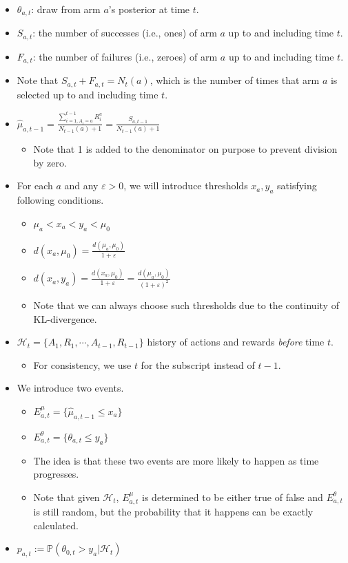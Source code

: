 \documentclass[11pt]{article}
\begin{document}
\begin{itemize}
    \item $\theta_{a, t}$: draw from arm $a$'s posterior at time $t$. 
    \item $S_{a, t}$: the number of successes (i.e., ones) of arm $a$
      up to and including time $t$.
    \item $F_{a, t}$: the number of failures (i.e., zeroes) of arm $a$
      up to and including time $t$. 
    \item Note that $S_{a, t} + F_{a, t} = N_t(a)$, which is the
      number of times that arm $a$ is selected up to and including time $t$. 
    \item $\hat{\mu}_{a, t-1} = \frac{\sum_{i=1, A_i = a}^{t-1}R_i^a}{N_{t-1}(a)+1} = \frac{S_{a, t-1}}{N_{t-1}(a) + 1}$
    \begin{itemize}
        \item Note that 1 is added to the denominator on purpose to prevent division by zero. 
    \end{itemize}
    \item For each $a$ and any $\varepsilon>0$, we will introduce thresholds $x_a, y_a$ satisfying following conditions. 
    \begin{itemize}
        \item $\mu_a < x_a < y_a < \mu_0$
        \item $d(x_a, \mu_0) = \frac{d(\mu_a, \mu_0)}{1 + \varepsilon}$
        \item $d(x_a, y_a) = \frac{d(x_a, \mu_0)}{1 + \varepsilon} = \frac{d(\mu_a, \mu_0)}{(1 + \varepsilon)^2}$
        \item Note that we can always choose such thresholds due to the continuity of KL-divergence. 
    \end{itemize}
    \item $\mathcal{H}_t = \{A_1, R_1, \cdots, A_{t-1}, R_{t-1}\}$ history of actions and rewards \textit{before} time $t$. 
    \begin{itemize}
        \item For consistency, we use $t$ for the subscript instead of $t-1$. 
    \end{itemize}
    \item We introduce two events. 
    \begin{itemize}
        \item $E^\mu_{a, t} = \{\hat{\mu}_{a, t-1} \leq x_a\}$
        \item $E^\theta_{a, t} = \{\theta_{a, t} \leq y_a\}$
        \item The idea is that these two events are more likely to
          happen as time progresses.
        \item Note that given $\mathcal{H}_t$, $E^\mu_{a, t}$ is determined to be either true of false and $E^\theta_{a, t}$ is still random, but the probability that it happens can be exactly calculated. 
    \end{itemize}
    \item $p_{a, t} := \mathbb{P}(\theta_{0, t} > y_a | \mathcal{H}_t)$
\end{itemize}
\end{document}
